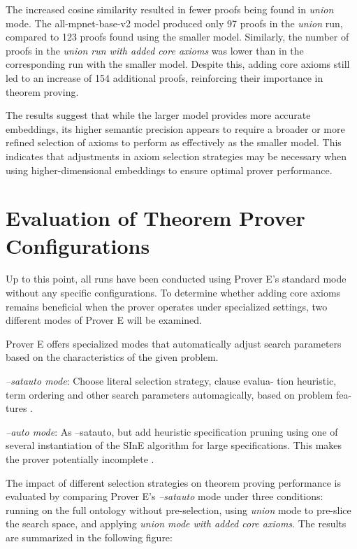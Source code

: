\documentclass[english,version-2020-11]{uzl-thesis}
\begin{document}
The increased cosine similarity resulted in fewer proofs being found in \textit{union} mode. The all-mpnet-base-v2 model produced only 97 proofs in the \textit{union} run, compared to 123 proofs found using the smaller model. Similarly, the number of proofs in the \textit{union run with added core axioms} was lower than in the corresponding run with the smaller model. Despite this, adding core axioms still led to an increase of 154 additional proofs, reinforcing their importance in theorem proving.

The results suggest that while the larger model provides more accurate embeddings, its higher semantic precision appears to require a broader or more refined selection of axioms to perform as effectively as the smaller model. This indicates that adjustments in axiom selection strategies may be necessary when using higher-dimensional embeddings to ensure optimal prover performance.


\section{Evaluation of Theorem Prover Configurations}

Up to this point, all runs have been conducted using Prover E's standard mode without any specific configurations. To determine whether adding core axioms remains beneficial when the prover operates under specialized settings, two different modes of Prover E will be examined.

Prover E offers specialized modes that automatically adjust search parameters based on the characteristics of the given problem.

\begin{definition}
    \textit{--satauto mode}: Choose literal selection strategy, clause evalua-
    tion heuristic, term ordering and other search
    parameters automagically, based on problem fea-
    tures \cite{schulz2019eprover}.
\end{definition}

\begin{definition}
    \textit{--auto mode}: As --satauto, but add heuristic specification
    pruning using one of several instantiation of the
    SInE algorithm for large specifications.
    This makes the prover potentially incomplete \cite{schulz2019eprover}.
\end{definition}


The impact of different selection strategies on theorem proving performance is evaluated by comparing Prover E's \textit{--satauto} mode under three conditions: running on the full ontology without pre-selection, using \textit{union} mode to pre-slice the search space, and applying \textit{union mode with added core axioms}. The results are summarized in the following figure:
\end{document}
